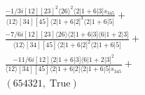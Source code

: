 \documentclass[varwidth, border=5pt]{standalone}
\begin{document}
\begin{my}
$\begin{gathered}
\scriptscriptstyle\frac{-1/3i[12][23]^2⟨26⟩^2⟨2|1+6|3]s_{345}}{⟨12⟩[34][45]⟨2|1+6|2]^3⟨2|1+6|5]}+\\
\scriptscriptstyle\frac{-7/6i[12][23]⟨26⟩⟨2|1+6|3]⟨6|1+2|3]}{⟨12⟩[34][45]⟨2|1+6|2]^2⟨2|1+6|5]}+\\
\scriptscriptstyle\frac{-11/6i[12]⟨2|1+6|3]⟨6|1+2|3]^2}{⟨12⟩[34][45]⟨2|1+6|2]⟨2|1+6|5]s_{345}}+\\
\scriptscriptstyle(654321,\;\text{True})\phantom{+}
\end{gathered}$
\end{my}
\end{document}
